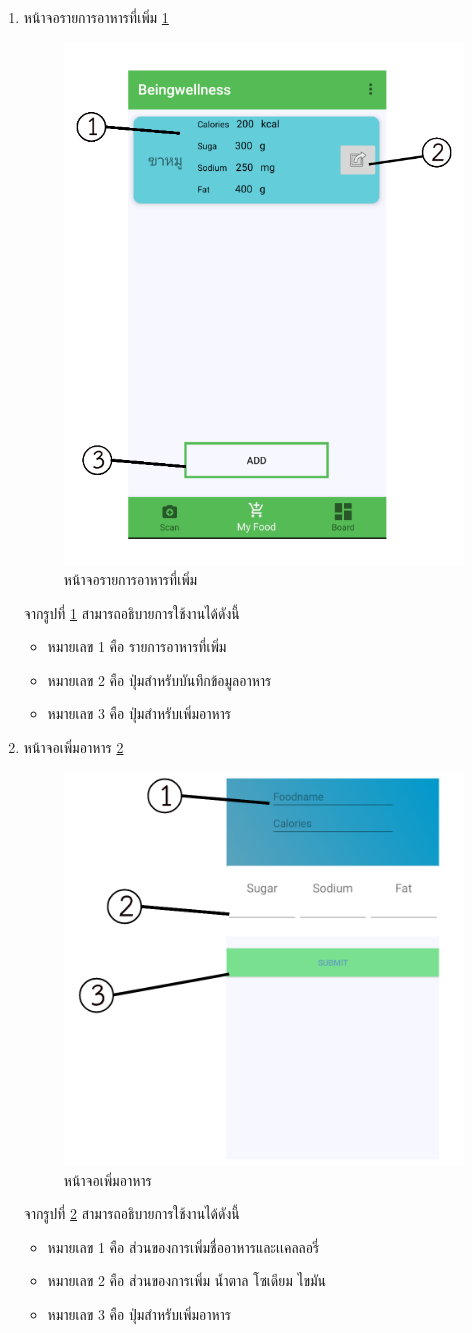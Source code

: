 \begin{enumerate}
								\item  หน้าจอรายการอาหารที่เพิ่ม \ref{Fig:useradd}
								\begin{figure}[H]
									\centering
									\includegraphics[width=0.5\columnwidth]{Figures/7/teach/13.png}
									\caption{หน้าจอรายการอาหารที่เพิ่ม}
									\label{Fig:useradd}
								\end{figure}
								จากรูปที่ \ref{Fig:useradd} สามารถอธิบายการใช้งานได้ดังนี้
								\begin{itemize}[label={--}]
									\item หมายเลข 1 คือ รายการอาหารที่เพิ่ม
									\item หมายเลข 2 คือ ปุ่มสำหรับบันทึกข้อมูลอาหาร
									\item หมายเลข 3 คือ ปุ่มสำหรับเพิ่มอาหาร
								
									\end{itemize}


									\item  หน้าจอเพิ่มอาหาร \ref{Fig:addbyuse}
									\begin{figure}[H]
										\centering
										\includegraphics[width=0.5\columnwidth]{Figures/7/teach/11.png}
										\caption{หน้าจอเพิ่มอาหาร}
										\label{Fig:addbyuse}
									\end{figure}
									จากรูปที่ \ref{Fig:addbyuse} สามารถอธิบายการใช้งานได้ดังนี้
									\begin{itemize}[label={--}]
										\item หมายเลข 1 คือ ส่วนของการเพิ่มชื่ออาหารและเเคลลอรี่
										\item หมายเลข 2 คือ ส่วนของการเพิ่ม น้ำตาล โซเดียม ไขมัน
										\item หมายเลข 3 คือ ปุ่มสำหรับเพิ่มอาหาร
									

\end{itemize}
\end{enumerate}
